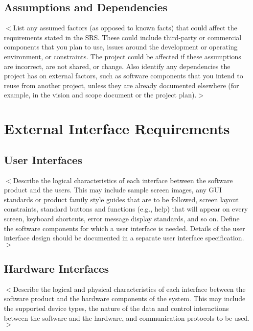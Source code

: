 \documentclass{scrreprt}
\begin{document}
\section{Assumptions and Dependencies}

$<$List any assumed factors (as opposed to known facts) that could affect the 
requirements stated in the SRS. These could include third-party or commercial 
components that you plan to use, issues around the development or operating 
environment, or constraints. The project could be affected if these assumptions 
are incorrect, are not shared, or change. Also identify any dependencies the 
project has on external factors, such as software components that you intend to 
reuse from another project, unless they are already documented elsewhere (for 
example, in the vision and scope document or the project plan).$>$


\chapter{External Interface Requirements}

\section{User Interfaces}
$<$Describe the logical characteristics of each interface between the software 
product and the users. This may include sample screen images, any GUI standards 
or product family style guides that are to be followed, screen layout 
constraints, standard buttons and functions (e.g., help) that will appear on 
every screen, keyboard shortcuts, error message display standards, and so on.  
Define the software components for which a user interface is needed. Details of 
the user interface design should be documented in a separate user interface 
specification.$>$

\section{Hardware Interfaces}
$<$Describe the logical and physical characteristics of each interface between 
the software product and the hardware components of the system. This may include 
the supported device types, the nature of the data and control interactions 
between the software and the hardware, and communication protocols to be 
used.$>$
\end{document}
